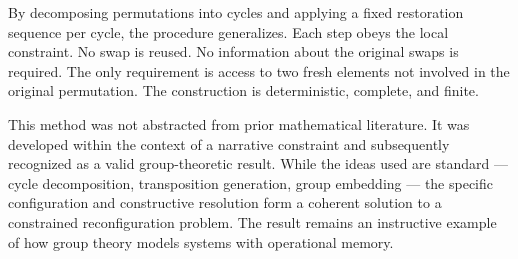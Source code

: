 By decomposing permutations into cycles and applying a fixed restoration sequence per cycle, the procedure generalizes. Each step obeys the local constraint. No swap is reused. No information about the original swaps is required. The only requirement is access to two fresh elements not involved in the original permutation. The construction is deterministic, complete, and finite.

This method was not abstracted from prior mathematical literature. It was developed within the context of a narrative constraint and subsequently recognized as a valid group-theoretic result. While the ideas used are standard — cycle decomposition, transposition generation, group embedding — the specific configuration and constructive resolution form a coherent solution to a constrained reconfiguration problem. The result remains an instructive example of how group theory models systems with operational memory.
